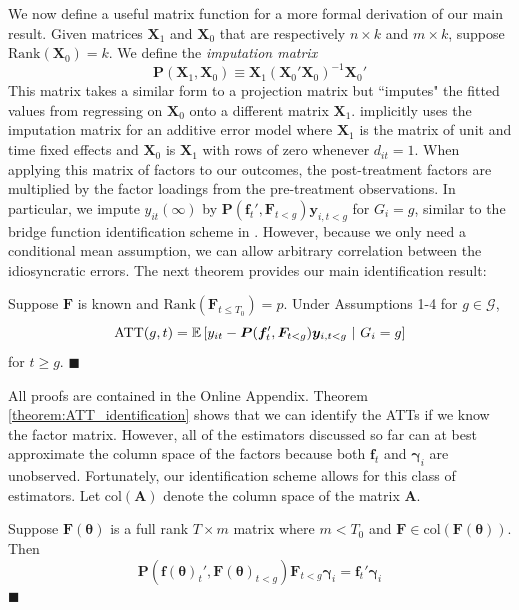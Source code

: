 \documentclass[12pt]{article}
\def\ATT{\text{ATT}}
\begin{document}
We now define a useful matrix function for a more formal derivation of our main result. Given matrices $\bm X_1$ and $\bm X_0$ that are respectively $n \times k$ and $m \times k$, suppose $\text{Rank}( \bm X_0) = k$. We define the \emph{imputation matrix} 
\begin{equation}
  \bm P(\bm X_1, \bm X_0) \equiv \bm X_1 (\bm X_0' \bm X_0)^{-1} \bm X_0'
\end{equation}
This matrix takes a similar form to a projection matrix but ``imputes" the fitted values from regressing on $\bm X_0$ onto a different matrix $\bm X_1$. \citet{Gardner_2021} implicitly uses the imputation matrix for an additive error model where $\bm X_1$ is the matrix of unit and time fixed effects and $\bm X_0$ is $\bm X_1$ with rows of zero whenever $d_{it} = 1$. When applying this matrix of factors to our outcomes, the post-treatment factors are multiplied by the factor loadings from the pre-treatment observations. In particular, we impute $y_{it}(\infty)$ by $\bm P(\bm f_{t}', \bm F_{t < g}) \bm y_{i,t < g}$ for $G_i = g$, similar to the bridge function identification scheme in \citet{Imbens_Kallus_Mao_2021}. However, because we only need a conditional mean assumption, we can allow arbitrary correlation between the idiosyncratic errors. The next theorem provides our main identification result:

\begin{theorem}\label{theorem:ATT_identification}
  Suppose $\bm F$ is known and $\text{Rank}(\bm F_{t \leq T_0}) = p$. Under Assumptions 1-4 for $g \in \mathcal{G}$,
  \begin{equation}\label{eq:ATT_moments}
    \ATT(g,t) = \condexpec{y_{it} - \bm P(\bm f_{t}', \bm F_{t < g}) \bm y_{i,t < g}}{G_i = g}
  \end{equation}
  for $t \geq g$. $\blacksquare$
\end{theorem}

All proofs are contained in the Online Appendix. Theorem \ref{theorem:ATT_identification} shows that we can identify the ATTs if we know the factor matrix. However, all of the estimators discussed so far can at best approximate the column space of the factors because both $\bm f_t$ and $\bm \gamma_i$ are unobserved. Fortunately, our identification scheme allows for this class of estimators. Let $\text{col}(\bm A)$ denote the column space of the matrix $\bm A$.  

\begin{theorem}\label{thm:rotation_indeterminancy}
  Suppose $\bm F(\bm \theta)$ is a full rank $T \times m$ matrix where $m < T_0$ and $\bm F \in \text{col}(\bm F(\bm \theta))$. Then
  \begin{equation}
    \bm P(\bm f(\bm \theta)_t', \bm F(\bm \theta)_{t < g}) \bm F_{t < g} \bm \gamma_i = \bm f_t' \bm \gamma_i
  \end{equation}
  $\blacksquare$
\end{theorem}
\end{document}
